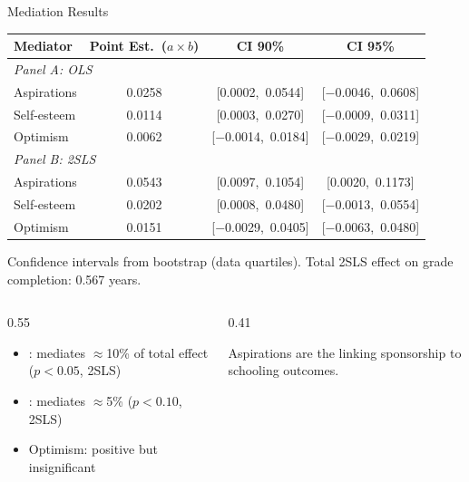 \documentclass[aspectratio=169, 10pt]{beamer}
\begin{document}
\begin{frame}{Mediation Results}
  \begin{center}
  \small
  \begin{tabular}{lccc}
    \toprule
    \textbf{Mediator} & \textbf{Point Est.\ ($a \times b$)} & \textbf{CI 90\%} & \textbf{CI 95\%} \\
    \midrule
    \multicolumn{4}{l}{\textit{Panel A: OLS}} \\
    Aspirations  & 0.0258 & [0.0002,\ 0.0544] & [$-$0.0046,\ 0.0608] \\
    Self-esteem  & 0.0114 & [0.0003,\ 0.0270] & [$-$0.0009,\ 0.0311] \\
    Optimism     & 0.0062 & [$-$0.0014,\ 0.0184] & [$-$0.0029,\ 0.0219] \\
    \midrule
    \multicolumn{4}{l}{\textit{Panel B: 2SLS}} \\
    Aspirations  & 0.0543 & [0.0097,\ 0.1054] & [0.0020,\ 0.1173] \\
    Self-esteem  & 0.0202 & [0.0008,\ 0.0480] & [$-$0.0013,\ 0.0554] \\
    Optimism     & 0.0151 & [$-$0.0029,\ 0.0405] & [$-$0.0063,\ 0.0480] \\
    \bottomrule
  \end{tabular}
  \end{center}
  \vspace{0.2em}
  {\small \color{medgray} Confidence intervals from bootstrap (data quartiles). Total 2SLS effect on grade completion: 0.567 years.}
  \begin{columns}
    \begin{column}{0.55\textwidth}
      \begin{itemize}
        \item {}: mediates $\approx$10\% of total effect ($p < 0.05$, 2SLS)
        \item {}: mediates $\approx$5\% ($p < 0.10$, 2SLS)
        \item Optimism: positive but insignificant
      \end{itemize}
    \end{column}
    \begin{column}{0.41\textwidth}
      \begin{keybox}
        \small Aspirations are the  linking sponsorship to schooling outcomes.
      \end{keybox}
    \end{column}
  \end{columns}
\end{frame}
\end{document}
